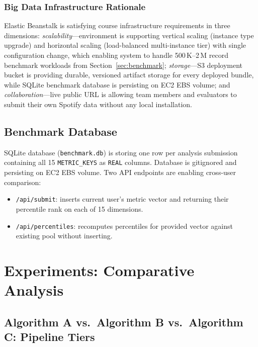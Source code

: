 \documentclass[conference]{IEEEtran}
\begin{document}
\subsubsection{Big Data Infrastructure Rationale}

Elastic Beanstalk is satisfying course infrastructure requirements in three dimensions: \textit{scalability}---environment is supporting vertical scaling (instance type upgrade) and horizontal scaling (load-balanced multi-instance tier) with single configuration change, which enabling system to handle 500\,K--2\,M record benchmark workloads from Section~\ref{sec:benchmark}; \textit{storage}---S3 deployment bucket is providing durable, versioned artifact storage for every deployed bundle, while SQLite benchmark database is persisting on EC2 EBS volume; and \textit{collaboration}---live public URL is allowing team members and evaluators to submit their own Spotify data without any local installation.

\subsection{Benchmark Database}

SQLite database (\texttt{benchmark.db}) is storing one row per analysis submission containing all 15 \texttt{METRIC\_KEYS} as \texttt{REAL} columns. Database is gitignored and persisting on EC2 EBS volume. Two API endpoints are enabling cross-user comparison:
\begin{itemize}
  \item \texttt{/api/submit}: inserts current user's metric vector and
        returning their percentile rank on each of 15 dimensions.
  \item \texttt{/api/percentiles}: recomputes percentiles for provided
        vector against existing pool without inserting.
\end{itemize}

\section{Experiments: Comparative Analysis}

\subsection{Algorithm A vs.\ Algorithm B vs.\ Algorithm C: Pipeline Tiers}
\end{document}
